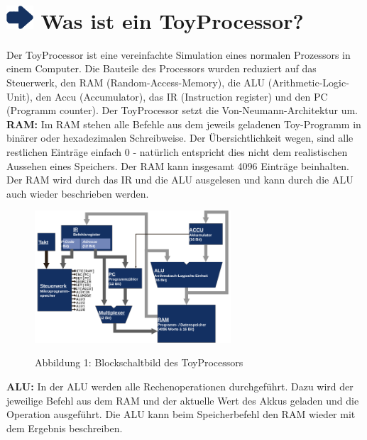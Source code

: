 \documentclass{article}
\begin{document}
\section*{\includegraphics[width=1cm]{./icon_umsetzung.png}
\hspace{0.25cm} Was ist ein ToyProcessor?}
Der ToyProcessor ist eine vereinfachte Simulation eines normalen Prozessors in
einem Computer. Die Bauteile des Processors wurden reduziert auf das
Steuerwerk, den RAM (Random-Access-Memory), die ALU (Arithmetic-Logic-Unit),
den Accu (Accumulator), das IR (Instruction register) und den PC (Programm
counter). Der ToyProcessor setzt die Von-Neumann-Architektur um.\\

\noindent \textbf{RAM:}
Im RAM stehen alle Befehle aus dem jeweils geladenen Toy-Programm in binärer oder
hexadezimalen Schreibweise. Der Übersichtlichkeit wegen, sind alle restlichen Einträge
einfach 0 - natürlich entspricht dies nicht dem realistischen Aussehen eines
Speichers. Der RAM kann insgesamt 4096 Einträge beinhalten. Der RAM wird durch das
IR und die ALU ausgelesen und kann durch die ALU auch wieder beschrieben werden.\\

\begin{figure}
    \centering \includegraphics[width=0.65\textwidth]{./picture_processor.png}\\
    \caption*{Abbildung 1: Blockschaltbild des ToyProcessors}
\end{figure}

\noindent \textbf{ALU:}
In der ALU werden alle Rechenoperationen durchgeführt. Dazu wird der jeweilige
Befehl aus dem RAM und der aktuelle Wert des Akkus geladen und die Operation
ausgeführt. Die ALU kann beim Speicherbefehl den RAM wieder mit dem
Ergebnis beschreiben.\\
\end{document}
